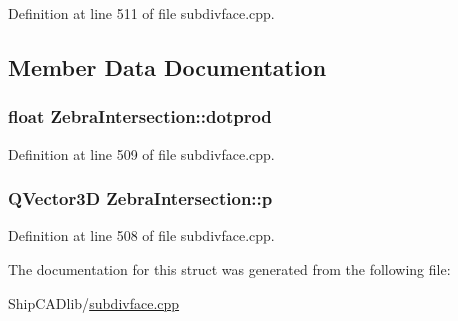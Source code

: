Definition at line 511 of file subdivface.\+cpp.



\subsection{Member Data Documentation}
\subsubsection[{\texorpdfstring{dotprod}{dotprod}}]{\setlength{\rightskip}{0pt plus 5cm}float Zebra\+Intersection\+::dotprod}\hypertarget{structZebraIntersection_a7da8915c55c4f1002df03c3294855a28}{}\label{structZebraIntersection_a7da8915c55c4f1002df03c3294855a28}


Definition at line 509 of file subdivface.\+cpp.

\subsubsection[{\texorpdfstring{p}{p}}]{\setlength{\rightskip}{0pt plus 5cm}Q\+Vector3D Zebra\+Intersection\+::p}\hypertarget{structZebraIntersection_a6395a4b6dd83979bed301b4a6366ecd7}{}\label{structZebraIntersection_a6395a4b6dd83979bed301b4a6366ecd7}


Definition at line 508 of file subdivface.\+cpp.



The documentation for this struct was generated from the following file\+:\begin{DoxyCompactItemize}
\item 
Ship\+C\+A\+Dlib/\hyperlink{subdivface_8cpp}{subdivface.\+cpp}\end{DoxyCompactItemize}
